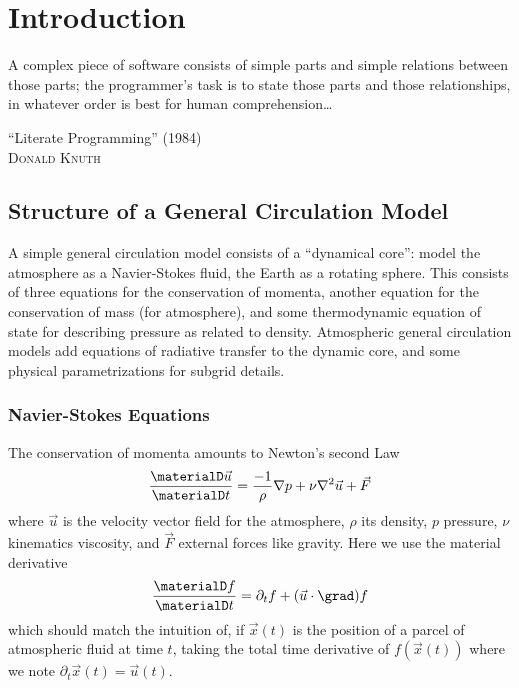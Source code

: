 \chapter{Introduction}


\epigraph{A complex piece of software consists of simple parts and simple
relations between those parts; the programmer's task is to state those
parts and those relationships, in whatever order is best for human
comprehension\dots%
}{``Literate Programming'' (1984)\\ %
\textsc{Donald Knuth}} %


\section{Structure of a General Circulation Model}

A simple general circulation model consists of a ``dynamical core'':
model the atmosphere as a Navier-Stokes fluid, the Earth as a rotating
sphere. This consists of three equations for the conservation of
momenta, another equation for the conservation of mass (for atmosphere),
and some thermodynamic equation of state for describing pressure as
related to density. Atmospheric general circulation models add equations
of radiative transfer to the dynamic core, and some physical
parametrizations for subgrid details.

\subsection{Navier-Stokes Equations}

The conservation of momenta amounts to Newton's second Law
\begin{equation}
  \frac{\materialD\vec{u}}{\materialD t}
  =\frac{-1}{\rho}\nabla p + \nu\nabla^{2}\vec{u} + \vec{F}
\end{equation}
where $\vec{u}$ is the velocity vector field for the atmosphere, $\rho$
its density, $p$ pressure, $\nu$ kinematics viscosity, and $\vec{F}$
external forces like gravity. Here we use the material derivative
\begin{equation}
  \frac{\materialD f}{\materialD t} = \partial_{t}f + (\vec{u}\cdot\grad)f
\end{equation}
which should match the intuition of, if $\vec{x}(t)$ is the position of
a parcel of atmospheric fluid at time $t$, taking the total time
derivative of $f(\vec{x}(t))$ where we note
$\partial_{t}\vec{x}(t)=\vec{u}(t)$.

